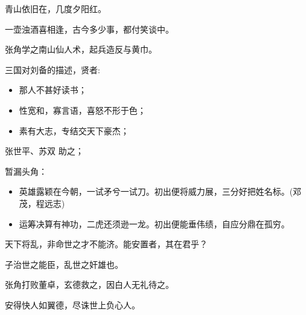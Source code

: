 \documentclass[UTF8,a4paper,8pt]{ctexart}
\begin{document}
			青山依旧在，几度夕阳红。
			
			一壶浊酒喜相逢，古今多少事，都付笑谈中。

			张角学之南山仙人术，起兵造反与黄巾。
			
			三国对刘备的描述，贤者:
			\begin{itemize}
				\item  那人不甚好读书；
				\item  性宽和，寡言语，喜怒不形于色；
				\item  素有大志，专结交天下豪杰；
			\end{itemize}
			张世平、苏双 助之；
			
			暂漏头角：
			\begin{itemize}
				\item 英雄露颖在今朝，一试矛兮一试刀。初出便将威力展，三分好把姓名标。(邓茂，程远志)
				\item 运筹决算有神功，二虎还须逊一龙。初出便能垂伟绩，自应分鼎在孤穷。
			\end{itemize}
			
			天下将乱，非命世之才不能济。能安置者，其在君乎？
			
			子治世之能臣，乱世之奸雄也。
			
			张角打败董卓，玄德救之，因白人无礼待之。
			
			安得快人如翼德，尽诛世上负心人。
\end{document}
